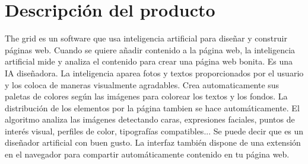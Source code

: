 \section{Descripción del producto}
The grid es un software que usa inteligencia artificial para diseñar y construir páginas web. Cuando se quiere añadir contenido a la página web, la inteligencia artificial mide y analiza el contenido para crear una página web bonita. Es una IA diseñadora. La inteligencia aparea fotos y textos proporcionados por el usuario y los coloca de maneras visualmente agradables. Crea automaticamente sus paletas de colores según las imágenes para colorear los textos y los fondos. La distribución de los elementos por la página tambien se hace automáticamente. El algoritmo analiza las imágenes detectando caras, expresiones faciales, puntos de interés visual, perfiles de color, tipografías compatibles... Se puede decir que es un diseñador artificial con buen gusto. La interfaz también dispone de una extensión en el navegador para compartir automáticamente contenido en tu página web.

